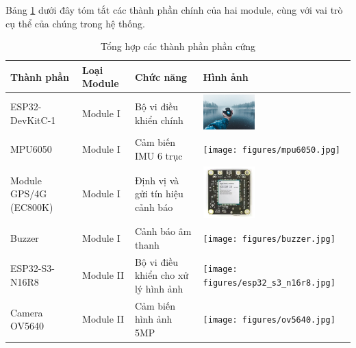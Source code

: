 Bảng \ref{tab:hardware_components} dưới đây tóm tắt các thành phần chính của hai module, cùng với vai trò cụ thể của chúng trong hệ thống.

\begin{table}[H]
    \centering
    \caption{Tổng hợp các thành phần phần cứng}
    \label{tab:hardware_components}
    \begin{tabular}{|l|l|l|l|}
        \hline
        \textbf{Thành phần} & \textbf{Loại Module} & \textbf{Chức năng} & \textbf{Hình ảnh} \\
        \hline
        ESP32-DevKitC-1 & Module I & Bộ vi điều khiển chính & \includegraphics[width=2cm]{figures/esp32.jpg} \\
        \hline
        MPU6050 & Module I & Cảm biến IMU 6 trục & \texttt{[image: figures/mpu6050.jpg]} \\
        \hline
        Module GPS/4G (EC800K) & Module I & Định vị và gửi tín hiệu cảnh báo & \includegraphics[width=2cm]{figures/ec800k.jpg} \\
        \hline
        Buzzer & Module I & Cảnh báo âm thanh & \texttt{[image: figures/buzzer.jpg]} \\
        \hline
        ESP32-S3-N16R8 & Module II & Bộ vi điều khiển cho xử lý hình ảnh & \texttt{[image: figures/esp32\_s3\_n16r8.jpg]} \\
        \hline
        Camera OV5640 & Module II & Cảm biến hình ảnh 5MP & \texttt{[image: figures/ov5640.jpg]} \\
        \hline
    \end{tabular}
\end{table}
